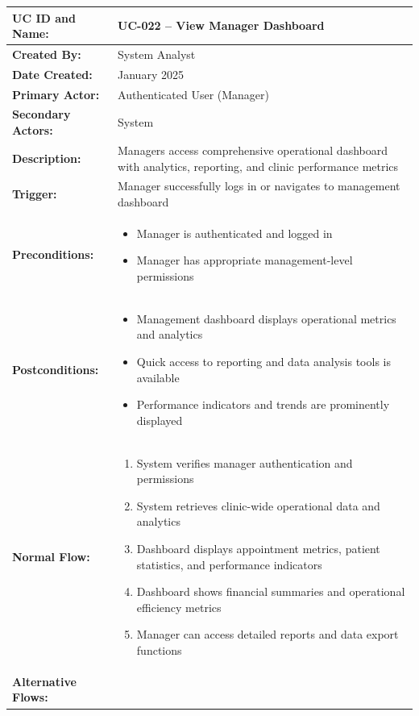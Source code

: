 \documentclass[12pt,a4paper]{article}
\begin{document}
\renewcommand{\arraystretch}{1.5}
\begin{longtable}{|p{4.5cm}|p{10.5cm}|}
\hline
\textbf{UC ID and Name:} & UC-022 – View Manager Dashboard \\
\hline
\textbf{Created By:} & System Analyst \\
\hline
\textbf{Date Created:} & January 2025 \\
\hline
\textbf{Primary Actor:} & Authenticated User (Manager) \\
\hline
\textbf{Secondary Actors:} & System \\
\hline
\textbf{Description:} & Managers access comprehensive operational dashboard with analytics, reporting, and clinic performance metrics \\
\hline
\textbf{Trigger:} & Manager successfully logs in or navigates to management dashboard \\
\hline
\textbf{Preconditions:} &
\begin{itemize}
  \item Manager is authenticated and logged in
  \item Manager has appropriate management-level permissions
\end{itemize} \\
\hline
\textbf{Postconditions:} &
\begin{itemize}
  \item Management dashboard displays operational metrics and analytics
  \item Quick access to reporting and data analysis tools is available
  \item Performance indicators and trends are prominently displayed
\end{itemize} \\
\hline
\textbf{Normal Flow:} &
\begin{enumerate}
  \item System verifies manager authentication and permissions
  \item System retrieves clinic-wide operational data and analytics
  \item Dashboard displays appointment metrics, patient statistics, and performance indicators
  \item Dashboard shows financial summaries and operational efficiency metrics
  \item Manager can access detailed reports and data export functions
\end{enumerate} \\
\hline
\textbf{Alternative Flows:} &

\end{longtable}
\end{document}
